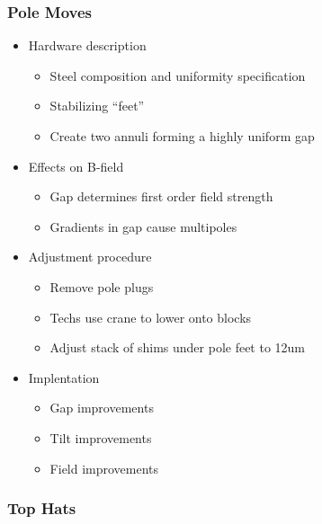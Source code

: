 \subsubsection{Pole Moves}

\begin{itemize}
  \item Hardware description
    \begin{itemize}
      \item Steel composition and uniformity specification
      \item Stabilizing ``feet''
      \item Create two annuli forming a highly uniform gap
    \end{itemize}
  \item Effects on B-field
    \begin{itemize}
      \item Gap determines first order field strength
      \item Gradients in gap cause multipoles
    \end{itemize}
  \item Adjustment procedure
    \begin{itemize}
      \item Remove pole plugs
      \item Techs use crane to lower onto blocks
      \item Adjust stack of shims under pole feet to 12um
    \end{itemize}
  \item Implentation
    \begin{itemize}
      \item Gap improvements
      \item Tilt improvements
      \item Field improvements
    \end{itemize}
\end{itemize}

\subsubsection{Top Hats}


